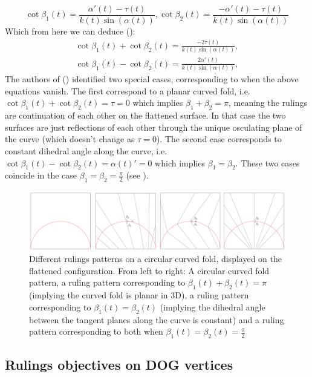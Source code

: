 \begin{equation}
\cot\beta_1(t) = \frac{\alpha'(t)-\tau(t)}{k(t)\sin(\alpha(t))},\cot\beta_2(t) = \frac{-\alpha'(t)-\tau(t)}{k(t)\sin(\alpha(t))}
\end{equation}
Which from here we can deduce (\cite{mathematical_omnibus,duncan_folded}):
\begin{equation} \label{cot_eq}
\begin{split}
\cot\beta_1(t) + \cot\beta_2(t) = \frac{-2\tau(t)}{k(t)\sin(\alpha(t))},\\
\cot\beta_1(t) - \cot\beta_2(t) = \frac{2\alpha'(t)}{k(t)\sin(\alpha(t))},
\end{split}	
\end{equation}
The authors of (\cite{mathematical_omnibus,duncan_folded}) identified two special cases, corresponding to when the above equations vanish. The first correspond to a planar curved fold, i.e. $\cot\beta_1(t) + \cot\beta_2(t) = \tau = 0$ which implies $\beta_1+\beta_2 = \pi$, meaning the rulings are continuation of each other on the flattened surface. In that case the two surfaces are just reflections of each other through the unique osculating plane of the curve (which doesn't change as $\tau = 0$). The second case corresponds to constant dihedral angle along the curve, i.e. $\cot\beta_1(t) - \cot\beta_2(t) = \alpha(t)' = 0$ which implies $\beta_1 = \beta_2$. These two cases coincide in the case $\beta_1 = \beta_2 = \frac{\pi}{2}$ (see ).


\begin{figure} [h]
	\centering
	\includegraphics[width=\linewidth]{figures/curved_different_rullings}
	\caption{Different rulings patterns on a circular curved fold, displayed on the flattened configuration. From left to right: A circular curved fold pattern, a ruling pattern corresponding to $\beta_1(t)+\beta_2(t)=\pi$ (implying the curved fold is planar in 3D), a ruling pattern corresponding to $\beta_1(t)=\beta_2(t)$ (implying the dihedral angle between the tangent planes along the curve is constant) and a ruling pattern corresponding to both when $\beta_1(t)=\beta_2(t)=\frac{\pi}{2}$}
	\label{fig:curved_different_rullings}
\end{figure}

\subsection{Rulings objectives on DOG vertices}
